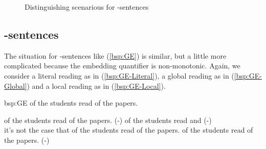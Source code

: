 \documentclass[fleqn,reqno,10pt,draft]{article}
\newcommand{\lit}{\acro{lit}}
\newcommand{\glb}{\acro{glb}}
\newcommand{\loc}{\acro{loc}}
\newcommand{\as}{\acro{as}}
\renewcommand{\es}{\acro{es}}
\newcommand{\mymark}[1]{{\color{mycol}{#1}}}
\begin{document}
\begin{figure}[]
{



}

  \caption{Distinguishing scenarious for \as-sentences}
  \label{fig:AS-distinguishing-pics}
\end{figure}


\subsection{\es-sentences}
\label{sec:es-sentences}

The situation for \es-sentences like (\ref{bsp:GE}) is similar, but a
little more complicated because the embedding quantifier is
non-monotonic. Again, we consider a literal reading as in
(\ref{bsp:GE-Literal}), a global reading as in (\ref{bsp:GE-Global})
and a local reading as in (\ref{bsp:GE-Local}).

\begin{exer}{bsp:GE}
\ex \mymark{Exactly one} of the students read {\mymark{some}} of the
  papers.

  \begin{xlist}
  \ex \mymark{Exactly one} of the students read
    {\mymark{some and maybe all}} of the papers. \hfill (\es-\lit)
  \ex 
    \mymark{Exactly one} of the students read \mymark{some and maybe all} 
    and  \hfill (\es-\glb)\\
    it's not the case that \mymark{exactly one} of the students read \mymark{all} of the papers.
  \ex 
    \mymark{Exactly one} of the students read {\mymark{some  but not all}} of the
    papers. \hfill (\es-\loc)
  \end{xlist}
\end{exer}
\end{document}
